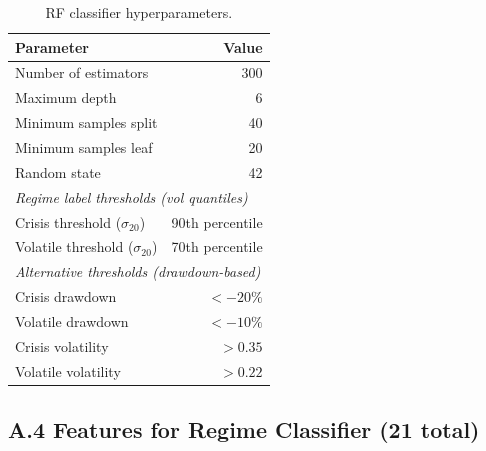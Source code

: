 \documentclass[conference]{IEEEtran}
\begin{document}
\begin{table}[h]
\centering
\caption{RF classifier hyperparameters.}
\label{tab:supp_rf}
\small
\begin{tabular}{lr}
\toprule
Parameter & Value \\
\midrule
Number of estimators & 300 \\
Maximum depth & 6 \\
Minimum samples split & 40 \\
Minimum samples leaf & 20 \\
Random state & 42 \\
\midrule
\multicolumn{2}{l}{\textit{Regime label thresholds (vol quantiles)}} \\
Crisis threshold ($\sigma_{20}$) & 90th percentile \\
Volatile threshold ($\sigma_{20}$) & 70th percentile \\
\midrule
\multicolumn{2}{l}{\textit{Alternative thresholds (drawdown-based)}} \\
Crisis drawdown & $< -20\%$ \\
Volatile drawdown & $< -10\%$ \\
Crisis volatility & $> 0.35$ \\
Volatile volatility & $> 0.22$ \\
\bottomrule
\end{tabular}
\end{table}

\subsection{A.4 Features for Regime Classifier (21 total)}
\end{document}
